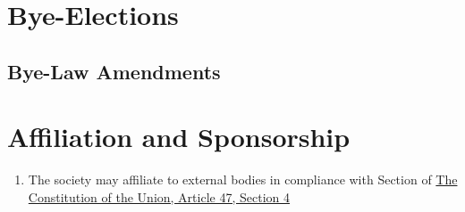 \documentclass{scrartcl}
\begin{document}
    \clearpage
    \section{Bye-Elections}
        \label{bye-election}
        \subsection{Bye-Law Amendments}
            \label{bye-election--bye-law-amendment}

    \clearpage
    \section{Affiliation and Sponsorship}
        \label{affiliation}
        \begin{enumerate}
            \item The society may affiliate to external bodies in compliance with Section of \href{https://lancastersu.co.uk/resources/articles-of-association-2023/download_attachment}{The Constitution of the Union, Article 47, Section 4}
        \end{enumerate}
\end{document}
